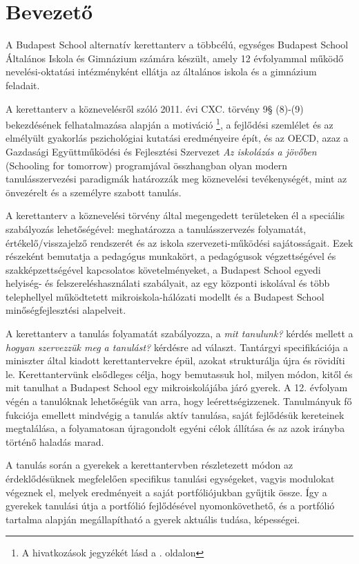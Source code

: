 \chapter{Bevezető}
A Budapest School alternatív kerettanterv a többcélú, egységes  Budapest School Általános Iskola és Gimnázium számára készült, amely 12 évfolyammal működő nevelési-oktatási intézményként ellátja az általános iskola és a gimnázium feladait. 

A kerettanterv a köznevelésről szóló 2011. évi CXC. törvény 9§ (8)-(9) bekezdésének felhatalmazása alapján a motiváció \cite{pink2011drive}\footnote{A hivatkozások jegyzékét lásd a \pageref{sec:bibliographyk}. oldalon}, a fejlődési szemlélet \cite{growthmindset} és az elmélyült gyakorlás \cite{ericsson2016peak}  pszichológiai kutatási eredményeire épít, és az  OECD, azaz a Gazdasági Együttműködési és Fejlesztési Szervezet \emph{Az iskolázás a jövőben}  (Schooling for tomorrow) programjával összhangban \cite{2006schooling}
olyan modern tanulásszervezési paradigmák határozzák meg köznevelési tevékenységét, mint az önvezérelt \cite{mitra2012beyond} és a személyre szabott \cite{khan2012one} tanulás.

A kerettanterv a köznevelési törvény által megengedett területeken él a speciális szabályozás lehetőségével: meghatározza a tanulásszervezés folyamatát, értékelő/visszajelző rendszerét és az iskola szervezeti-működési sajátosságait. Ezek részeként bemutatja a pedagógus munkakört, a pedagógusok végzettségével és szakképzettségével kapcsolatos követelményeket, a Budapest School  egyedi helyiség- és felszereléshasználati szabályait, az egy központi iskolával és több telephellyel működtetett mikroiskola-hálózati modellt és a Budapest School minőségfejlesztési alapelveit.

A kerettanterv  a tanulás folyamatát szabályozza, a \emph{mit tanulunk?} kérdés mellett a \emph{hogyan szervezzük meg a tanulást?} kérdésre ad választ. Tantárgyi specifikációja a miniszter által kiadott kerettantervekre \cite{ofi:kerettanterv} épül, azokat strukturálja újra és rövidíti le. Kerettantervünk elsődleges célja, hogy bemutassuk hol, milyen módon, kitől és mit tanulhat a Budapest School egy mikroiskolájába járó gyerek. A 12. évfolyam végén a tanulóknak lehetőségük van arra, hogy leérettségizzenek. Tanulmányuk fő fukciója emellett mindvégig a tanulás aktív tanulása, saját fejlődésük kereteinek megtalálása, a folyamatosan újragondolt egyéni célok állítása és az azok irányba történő haladás marad.

A tanulás során a gyerekek a kerettantervben részletezett módon az érdeklődésüknek megfelelően specifikus tanulási egységeket, vagyis modulokat végeznek el, melyek eredményeit a saját portfóliójukban gyűjtik össze. Így a gyerekek tanulási útja a portfólió fejlődésével nyomonkövethető, és a portfólió tartalma alapján megállapítható a gyerek aktuális tudása, képességei.

